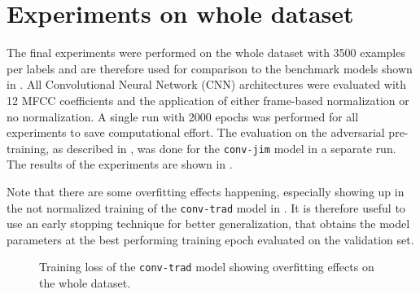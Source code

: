 
\section{Experiments on whole dataset}\label{sec:exp_final}
The final experiments were performed on the whole dataset with 3500 examples per labels and are therefore used for comparison to the benchmark models shown in .
All Convolutional Neural Network (CNN) architectures were evaluated with 12 MFCC coefficients and the application of either frame-based normalization or no normalization.
A single run with 2000 epochs was performed for all experiments to save computational effort.
The evaluation on the adversarial pre-training, as described in , was done for the \texttt{conv-jim} model in a separate run.
The results of the experiments are shown in .

Note that there are some overfitting effects happening, especially showing up in the not normalized training of the \texttt{conv-trad} model in .
It is therefore useful to use an early stopping technique for better generalization, that obtains the model parameters at the best performing training epoch evaluated on the validation set.
\begin{figure}[!ht]
  \centering
  \caption{Training loss of the \texttt{conv-trad} model showing overfitting effects on the whole dataset.}
  \label{fig:exp_final_loss_conv-trad}
\end{figure}
